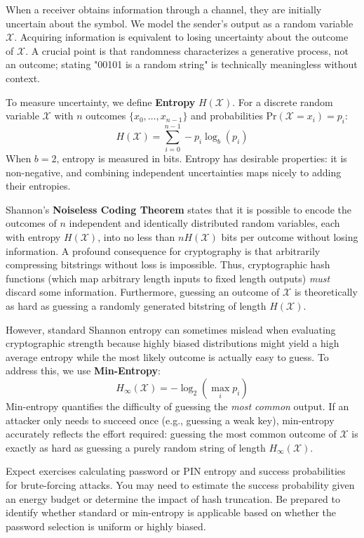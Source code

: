 When a receiver obtains information through a channel, they are initially uncertain about the symbol. We model the sender's output as a random variable $\mathcal{X}$. Acquiring information is equivalent to losing uncertainty about the outcome of $\mathcal{X}$. A crucial point is that randomness characterizes a generative process, not an outcome; stating "00101 is a random string" is technically meaningless without context.

To measure uncertainty, we define \textbf{Entropy} $H(\mathcal{X})$. For a discrete random variable $\mathcal{X}$ with $n$ outcomes $\{x_0, \dots, x_{n-1}\}$ and probabilities $\text{Pr}(\mathcal{X} = x_i) = p_i$:
\[
H(\mathcal{X}) = \sum_{i=0}^{n-1} -p_i \log_b(p_i)
\]
When $b=2$, entropy is measured in bits. Entropy has desirable properties: it is non-negative, and combining independent uncertainties maps nicely to adding their entropies. 

Shannon's \textbf{Noiseless Coding Theorem} states that it is possible to encode the outcomes of $n$ independent and identically distributed random variables, each with entropy $H(\mathcal{X})$, into no less than $n H(\mathcal{X})$ bits per outcome without losing information. A profound consequence for cryptography is that arbitrarily compressing bitstrings without loss is impossible. Thus, cryptographic hash functions (which map arbitrary length inputs to fixed length outputs) \textit{must} discard some information. Furthermore, guessing an outcome of $\mathcal{X}$ is theoretically as hard as guessing a randomly generated bitstring of length $H(\mathcal{X})$.

However, standard Shannon entropy can sometimes mislead when evaluating cryptographic strength because highly biased distributions might yield a high average entropy while the most likely outcome is actually easy to guess. To address this, we use \textbf{Min-Entropy}:
\[
H_\infty(\mathcal{X}) = -\log_2(\max_i p_i)
\]
Min-entropy quantifies the difficulty of guessing the \textit{most common} output. If an attacker only needs to succeed once (e.g., guessing a weak key), min-entropy accurately reflects the effort required: guessing the most common outcome of $\mathcal{X}$ is exactly as hard as guessing a purely random string of length $H_\infty(\mathcal{X})$.

\begin{tcolorbox}[colback=blue!5!white,colframe=blue!75!black,title=Exam Insight]
Expect exercises calculating password or PIN entropy and success probabilities for brute-forcing attacks. You may need to estimate the success probability given an energy budget or determine the impact of hash truncation. Be prepared to identify whether standard or min-entropy is applicable based on whether the password selection is uniform or highly biased.
\end{tcolorbox}

